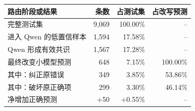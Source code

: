 \begin{tabular}{lrrr}
\toprule
路由阶段或结果 & 条数 & 占测试集 & 占改写预测 \\
\midrule
完整测试集 & 9,069 & 100.00\% & --\\
进入 Qwen 的低置信样本 & 1,594 & 17.58\% & --\\
Qwen 形成有效共识 & 1,567 & 17.28\% & --\\
最终改变小模型预测 & 648 & 7.15\% & 100.00\%\\
其中：纠正原错误 & 349 & 3.85\% & 53.86\%\\
其中：破坏原正确项 & 299 & 3.30\% & 46.14\%\\
\rowcolor{LightGreen}净增加正确预测 & +50 & +0.55\% & --\\
\bottomrule
\end{tabular}
